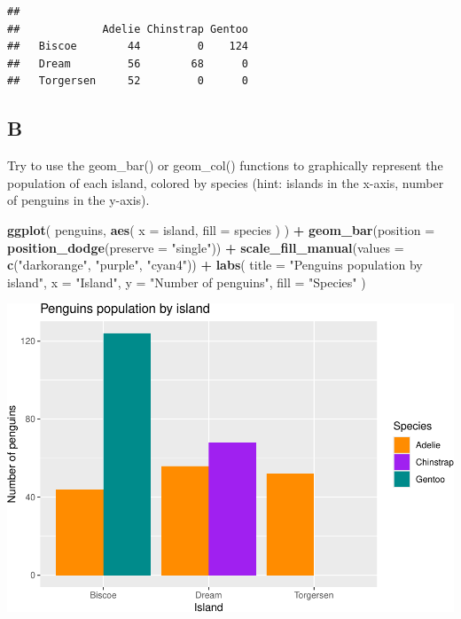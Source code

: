 \documentclass[
]{article}
\newenvironment{Shaded}{\begin{snugshade}}{\end{snugshade}}
\newcommand{\AttributeTok}[1]{\textcolor[rgb]{0.13,0.29,0.53}{#1}}
\newcommand{\FunctionTok}[1]{\textcolor[rgb]{0.13,0.29,0.53}{\textbf{#1}}}
\newcommand{\NormalTok}[1]{#1}
\newcommand{\SpecialCharTok}[1]{\textcolor[rgb]{0.81,0.36,0.00}{\textbf{#1}}}
\newcommand{\StringTok}[1]{\textcolor[rgb]{0.31,0.60,0.02}{#1}}
\begin{document}
\begin{verbatim}
##            
##             Adelie Chinstrap Gentoo
##   Biscoe        44         0    124
##   Dream         56        68      0
##   Torgersen     52         0      0
\end{verbatim}

\hypertarget{b-4}{%
\subsection{B}\label{b-4}}

Try to use the geom\_bar() or geom\_col() functions to graphically
represent the population of each island, colored by species (hint:
islands in the x-axis, number of penguins in the y-axis).

\begin{Shaded}
\begin{Highlighting}[]
\FunctionTok{ggplot}\NormalTok{(}
\NormalTok{  penguins,}
  \FunctionTok{aes}\NormalTok{(}
    \AttributeTok{x =}\NormalTok{ island,}
    \AttributeTok{fill =}\NormalTok{ species}
\NormalTok{  )}
\NormalTok{) }\SpecialCharTok{+}
  \FunctionTok{geom\_bar}\NormalTok{(}\AttributeTok{position =} \FunctionTok{position\_dodge}\NormalTok{(}\AttributeTok{preserve =} \StringTok{"single"}\NormalTok{)) }\SpecialCharTok{+}
  \FunctionTok{scale\_fill\_manual}\NormalTok{(}\AttributeTok{values =} \FunctionTok{c}\NormalTok{(}\StringTok{"darkorange"}\NormalTok{, }\StringTok{"purple"}\NormalTok{, }\StringTok{"cyan4"}\NormalTok{)) }\SpecialCharTok{+}
  \FunctionTok{labs}\NormalTok{(}
    \AttributeTok{title =} \StringTok{"Penguins population by island"}\NormalTok{,}
    \AttributeTok{x =} \StringTok{"Island"}\NormalTok{,}
    \AttributeTok{y =} \StringTok{"Number of penguins"}\NormalTok{,}
    \AttributeTok{fill =} \StringTok{"Species"}
\NormalTok{  )}
\end{Highlighting}
\end{Shaded}

\includegraphics{es_files/figure-latex/unnamed-chunk-18-1.pdf}
\end{document}
